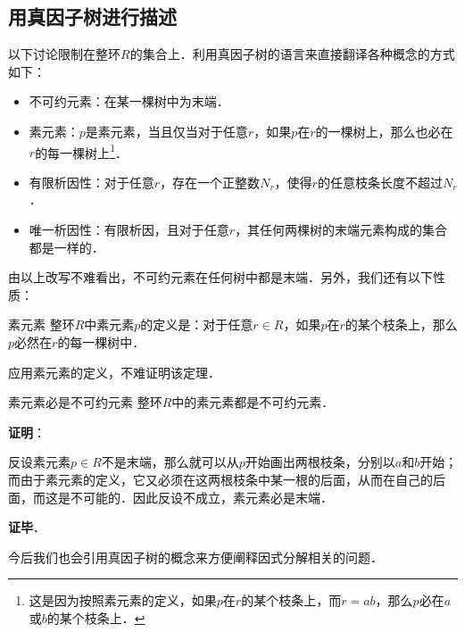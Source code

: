 

\subsection{用真因子树进行描述}

以下讨论限制在整环$R$的集合上．利用真因子树的语言来直接翻译各种概念的方式如下：

\begin{definition}{}\label{FctTre_def1}
\begin{itemize}
\item 不可约元素：在某一棵树中为末端．
\item 素元素：$p$是素元素，当且仅当对于任意$r$，如果$p$在$r$的一棵树上，那么也必在$r$的每一棵树上\footnote{这是因为按照素元素的定义，如果$p$在$r$的某个枝条上，而$r=ab$，那么$p$必在$a$或$b$的某个枝条上．}．
\item 有限析因性：对于任意$r$，存在一个正整数$N_r$，使得$r$的任意枝条长度不超过$N_r$．
\item 唯一析因性：有限析因，且对于任意$r$，其任何两棵树的末端元素构成的集合都是一样的．
\end{itemize}
\end{definition}

由以上改写不难看出，不可约元素在任何树中都是末端．另外，我们还有以下性质：

\begin{theorem}{素元素}
整环$R$中素元素$p$的定义是：对于任意$r\in R$，如果$p$在$r$的某个枝条上，那么$p$必然在$r$的每一棵树中．
\end{theorem}

应用素元素的定义，不难证明该定理．


\begin{theorem}{素元素必是不可约元素}
整环$R$中的素元素都是不可约元素．
\end{theorem}

\textbf{证明}：

反设素元素$p\in R$不是末端，那么就可以从$p$开始画出两根枝条，分别以$a$和$b$开始；而由于素元素的定义，它又必须在这两根枝条中某一根的后面，从而在自己的后面，而这是不可能的．因此反设不成立，素元素必是末端．

\textbf{证毕}．

今后我们也会引用真因子树的概念来方便阐释因式分解相关的问题．

